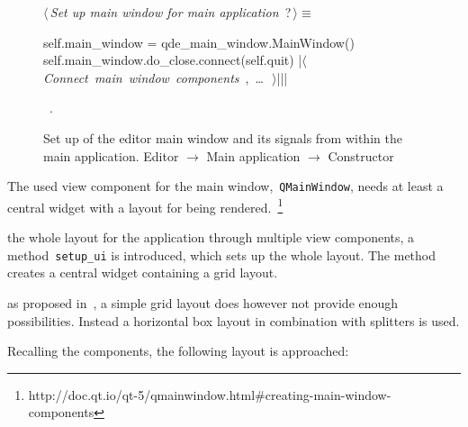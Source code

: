 \documentclass[%
    a4paper,    %
    justified,  %
    nobib,      %
    openany     %
]{tufte-book}
\begin{document}
\begin{figure}
\begin{flushleft} \small
\begin{minipage}{\linewidth}\label{scrap19}\raggedright\small
{} $\langle\,${\itshape Set up main window for main application}\nobreak\ {\footnotesize {?}}$\,\rangle\equiv$
\vspace{-1ex}
\begin{pythoncode}
self.main_window = qde_main_window.MainWindow()
self.main_window.do_close.connect(self.quit)
|\hbox{$\langle\,${\itshape Connect main window components}\nobreak\ {\footnotesize {}, \ldots\ }$\,\rangle$}||\NWsep|
\end{pythoncode}
\vspace{1.5ex}
\footnotesize
\begin{list}{}{\setlength{\itemsep}{-\parsep}\setlength{\itemindent}{-\leftmargin}}
\item \NWtxtMacroRefIn\ .

\item{}
\end{list}
\end{minipage}\vspace{4ex}
\end{flushleft}
\caption{Set up of the editor main window and its signals from within the main
  application. \newline{}\newline{}Editor $\rightarrow$ Main application
  $\rightarrow$ Constructor}
\label{editor:lst:main-application:constructor:main-window}
\end{figure}

The used view component for the main window,~\verb=QMainWindow=, needs at least
a central widget with a layout for being
rendered.~\footnote{http://doc.qt.io/qt-5/qmainwindow.html\#creating-main-window-components}

 the whole layout for the
application through multiple view components, a method~\verb=setup_ui= is
introduced, which sets up the whole layout. The method creates a central widget
containing a grid layout.

 as proposed in~, a simple grid layout does however not provide enough
possibilities. Instead a horizontal box layout in combination with splitters is
used.

Recalling the components, the following layout is approached:
\end{document}

